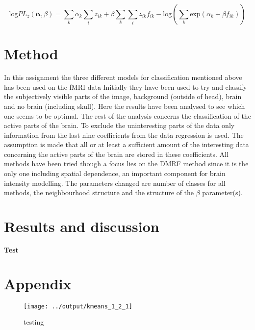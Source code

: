 \documentclass[a4paper,english]{article}
\newcommand{\sexion}[1]{\section{#1}}
\begin{document}
\begin{equation}
	\text{log} PL_z(\boldsymbol{\alpha},\beta) = \sum_k \alpha_k \sum_i z_{ik} + \beta \sum_k \sum_i z_{ik}f_{ik} - \text{log}(\sum_k \text{exp}(\alpha_k + \beta f_{ik}))
\end{equation}



\section{Method}
In this assignment the three different models for classification mentioned above has been used on the fMRI data
Initially they have been used to try and classify the subjectively visible parts of the image, background (outside of head), brain and no brain (including skull).
Here the results have been analysed to see which one seems to be optimal.
The rest of the analysis concerns the classification of the active parts of the brain.
To exclude the uninteresting parts of the data only information from the last nine coefficients from the data regression is used.
The assumption is made that all or at least a sufficient amount of the interesting data concerning the active parts of the brain are stored in these coefficients.
All methods have been tried though a focus lies on the DMRF method since it is the only one including spatial dependence, an important component for brain intensity modelling.
The parameters changed are number of classes for all methods, the neighbourhood structure and the structure of the $\beta$ parameter(s).

\section{Results and discussion}


\newpage

\begin{thebibliography}{37}
   {\textbf{Test}}
\end{thebibliography}
\pagebreak{}

\sexion{Appendix}
\begin{figure}[H]
  \centering
  \texttt{[image: ../output/kmeans\_1\_2\_1]}
  \caption{testing}
  \label{fig:kmeans:1:2:1}
\end{figure}


% 


\pagebreak{}
\thispagestyle{empty}
\end{document}
